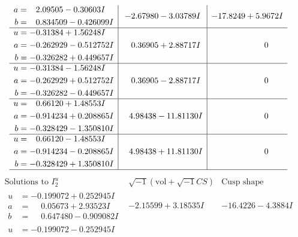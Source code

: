\documentclass[1p]{elsarticle_modified}
\theoremstyle{definition}
\newcommand{\I}{\sqrt{-1}}
\begin{document}
$$\begin{array}{c|c|c}
\begin{aligned}
a &= \phantom{-}2.09505 - 0.30603 I \\
b &= \phantom{-}0.834509 - 0.426099 I\end{aligned}
 & -2.67980 - 3.03789 I & -17.8249 + 5.9672 I \\ \hline\begin{aligned}
u &= -0.31384 + 1.56248 I \\
a &= -0.262929 - 0.512752 I \\
b &= -0.326282 + 0.449657 I\end{aligned}
 & \phantom{-}0.36905 + 2.88717 I & \phantom{-0.000000 } 0 \\ \hline\begin{aligned}
u &= -0.31384 - 1.56248 I \\
a &= -0.262929 + 0.512752 I \\
b &= -0.326282 - 0.449657 I\end{aligned}
 & \phantom{-}0.36905 - 2.88717 I & \phantom{-0.000000 } 0 \\ \hline\begin{aligned}
u &= \phantom{-}0.66120 + 1.48553 I \\
a &= -0.914234 + 0.208865 I \\
b &= -0.328429 - 1.350810 I\end{aligned}
 & \phantom{-}4.98438 - 11.81130 I & \phantom{-0.000000 } 0 \\ \hline\begin{aligned}
u &= \phantom{-}0.66120 - 1.48553 I \\
a &= -0.914234 - 0.208865 I \\
b &= -0.328429 + 1.350810 I\end{aligned}
 & \phantom{-}4.98438 + 11.81130 I & \phantom{-0.000000 } 0\\
 \hline 
 \end{array}$$\newpage$$\begin{array}{c|c|c}  
\text{Solutions to }I^u_{2}& \I (\text{vol} + \sqrt{-1}CS) & \text{Cusp shape}\\
 \hline 
\begin{aligned}
u &= -0.199072 + 0.252945 I \\
a &= \phantom{-}0.05673 + 2.93523 I \\
b &= \phantom{-}0.647480 - 0.909082 I\end{aligned}
 & -2.15599 + 3.18535 I & -16.4226 - 4.3884 I \\ \hline\begin{aligned}
u &= -0.199072 - 0.252945 I \\

\end{aligned}
\end{array}$$
\end{document}
